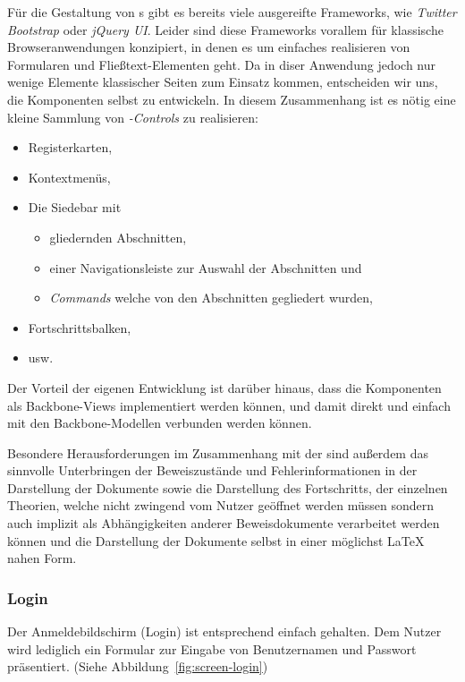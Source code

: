 Für die Gestaltung von  s gibt es bereits viele ausgereifte Frameworks, wie
\textit{Twitter Bootstrap} oder \textit{jQuery UI}. Leider sind diese Frameworks vorallem für
klassische Browseranwendungen konzipiert, in denen es um einfaches realisieren von Formularen und
Fließtext-Elementen geht. Da in diser Anwendung jedoch nur wenige Elemente klassischer Seiten zum
Einsatz kommen, entscheiden wir uns, die  Komponenten selbst zu entwickeln. In diesem
Zusammenhang ist es nötig eine kleine Sammlung von \textit{-Controls} zu realisieren:

\begin{itemize}
  \item Registerkarten,
  \item Kontextmenüs,
  \item Die Siedebar mit
    \begin{itemize}      
      \item gliedernden Abschnitten,
      \item einer Navigationsleiste zur Auswahl der Abschnitten und
      \item \textit{Commands} welche von den Abschnitten gegliedert wurden,
    \end{itemize}
  \item Fortschrittsbalken,
  \item usw.
\end{itemize}

Der Vorteil der eigenen Entwicklung ist darüber hinaus, dass die Komponenten als Backbone-Views
implementiert werden können, und damit direkt und einfach mit den Backbone-Modellen verbunden werden
können.

Besondere Herausforderungen im Zusammenhang mit der  sind außerdem das sinnvolle
Unterbringen der Beweiszustände und Fehlerinformationen in der Darstellung der Dokumente sowie die
Darstellung des Fortschritts, der einzelnen Theorien, welche nicht zwingend vom Nutzer geöffnet
werden müssen sondern auch implizit als Abhängigkeiten anderer Beweisdokumente verarbeitet werden
können und die Darstellung der Dokumente selbst in einer möglichst LaTeX nahen Form.

\subsubsection{Login}

Der Anmeldebildschirm (Login) ist entsprechend einfach gehalten. Dem Nutzer wird lediglich ein
Formular zur Eingabe von Benutzernamen und Passwort präsentiert. (Siehe Abbildung 
\,\ref{fig:screen-login})

